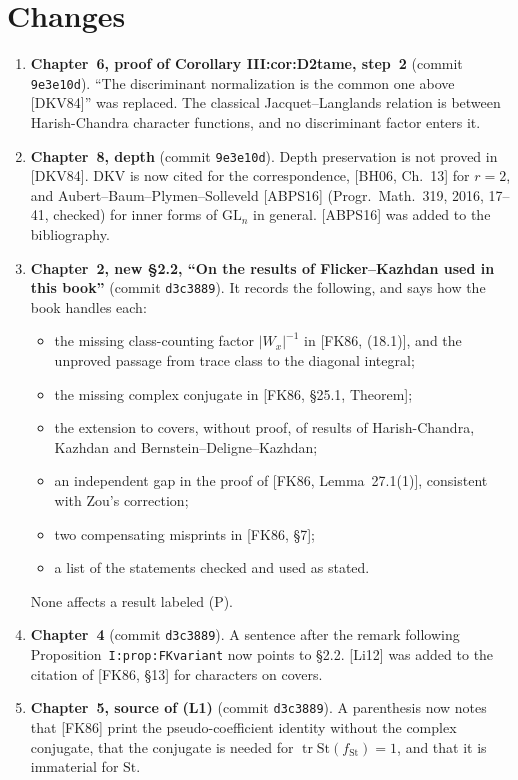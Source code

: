 \documentclass[12pt,letterpaper]{amsart}
\begin{document}
\section{Changes}
\begin{enumerate}[leftmargin=*,label=\textbf{C\arabic*.}]
\item \textbf{Chapter~6, proof of Corollary III:cor:D2tame, step~2} (commit \texttt{9e3e10d}). ``The discriminant normalization is the common one above [DKV84]'' was replaced. The classical Jacquet--Langlands relation is between Harish-Chandra character functions, and no discriminant factor enters it.
\item \textbf{Chapter~8, depth} (commit \texttt{9e3e10d}). Depth preservation is not proved in [DKV84]. DKV is now cited for the correspondence, [BH06, Ch.~13] for $r=2$, and Aubert--Baum--Plymen--Solleveld [ABPS16] (Progr.\ Math.\ 319, 2016, 17--41, checked) for inner forms of $\mathrm{GL}_n$ in general. [ABPS16] was added to the bibliography.
\item \textbf{Chapter~2, new \S2.2, ``On the results of Flicker--Kazhdan used in this book''} (commit \texttt{d3c3889}). It records the following, and says how the book handles each:
 \begin{itemize}[leftmargin=*]
 \item the missing class-counting factor $|W_x|^{-1}$ in [FK86, (18.1)], and the unproved passage from trace class to the diagonal integral;
 \item the missing complex conjugate in [FK86, \S25.1, Theorem];
 \item the extension to covers, without proof, of results of Harish-Chandra, Kazhdan and Bernstein--Deligne--Kazhdan;
 \item an independent gap in the proof of [FK86, Lemma~27.1(1)], consistent with Zou's correction;
 \item two compensating misprints in [FK86, \S7];
 \item a list of the statements checked and used as stated.
 \end{itemize}
 None affects a result labeled (P).
\item \textbf{Chapter~4} (commit \texttt{d3c3889}). A sentence after the remark following Proposition~\texttt{I:prop:\allowbreak FKvariant} now points to \S2.2. [Li12] was added to the citation of [FK86, \S13] for characters on covers.
\item \textbf{Chapter~5, source of (L1)} (commit \texttt{d3c3889}). A parenthesis now notes that [FK86] print the pseudo-coefficient identity without the complex conjugate, that the conjugate is needed for $\operatorname{tr}\mathrm{St}(f_{\mathrm{St}})=1$, and that it is immaterial for $\mathrm{St}$.

\end{enumerate}
\end{document}
